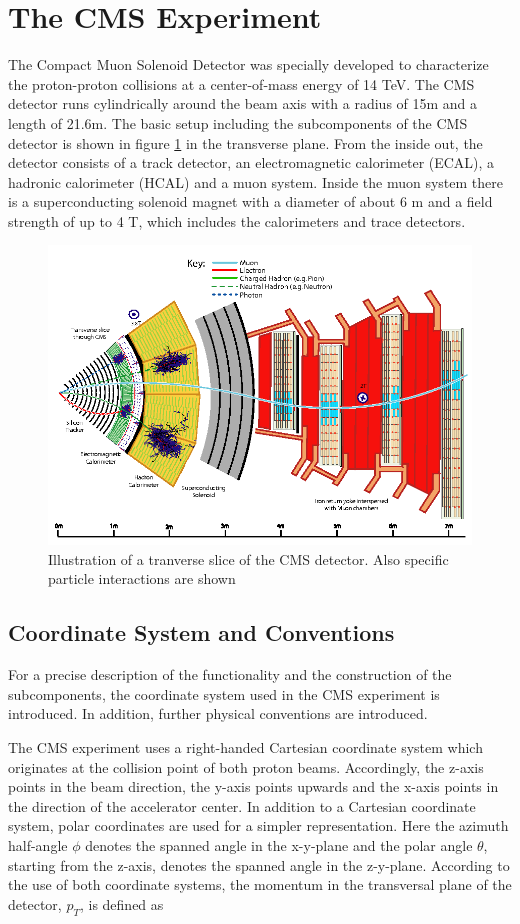 \documentclass[12pt, a4paper]{thesis}
\begin{document}
\section{The CMS Experiment}
\label{sec:orge5edd5f}
The Compact Muon Solenoid Detector was specially developed to
characterize the proton-proton collisions at a center-of-mass energy
of 14 TeV. The CMS detector runs cylindrically around the beam axis
with a radius of 15m and a length of 21.6m. The basic setup including
the subcomponents of the CMS detector is shown in figure
\ref{cms-detector} in the transverse plane.  From the inside out, the
detector consists of a track detector, an electromagnetic calorimeter
(ECAL), a hadronic calorimeter (HCAL) and a muon system.  Inside the
muon system there is a superconducting solenoid magnet with a diameter
of about 6 m and a field strength of up to 4 T, which includes the
calorimeters and trace detectors.
\begin{figure}[H]
\centering
\includegraphics[width=0.8 \textwidth]{../images/cms_detector.png}
\caption{Illustration of a tranverse slice of the CMS detector. Also specific particle interactions are shown \cite{sirunyan17}}
\label{cms-detector}
\end{figure}

\subsection{Coordinate System and Conventions} %
\label{sec:org067f254}

For a precise description of the functionality and the construction of
the subcomponents, the coordinate system used in the CMS experiment is
introduced. In addition, further physical conventions are introduced.

The CMS experiment uses a right-handed Cartesian coordinate system which
originates at the collision point of both proton beams. Accordingly, the z-axis
points in the beam direction, the y-axis points upwards and the x-axis points in
the direction of the accelerator center. In addition to a Cartesian coordinate
system, polar coordinates are used for a simpler representation. Here the
azimuth half-angle \(\phi\) denotes the spanned angle in the x-y-plane and the polar
angle \(\theta\), starting from the z-axis, denotes the spanned angle in the
z-y-plane.
According to the use of both coordinate systems, the momentum in the transversal
plane of the detector, \(p_T\), is defined as
\end{document}
